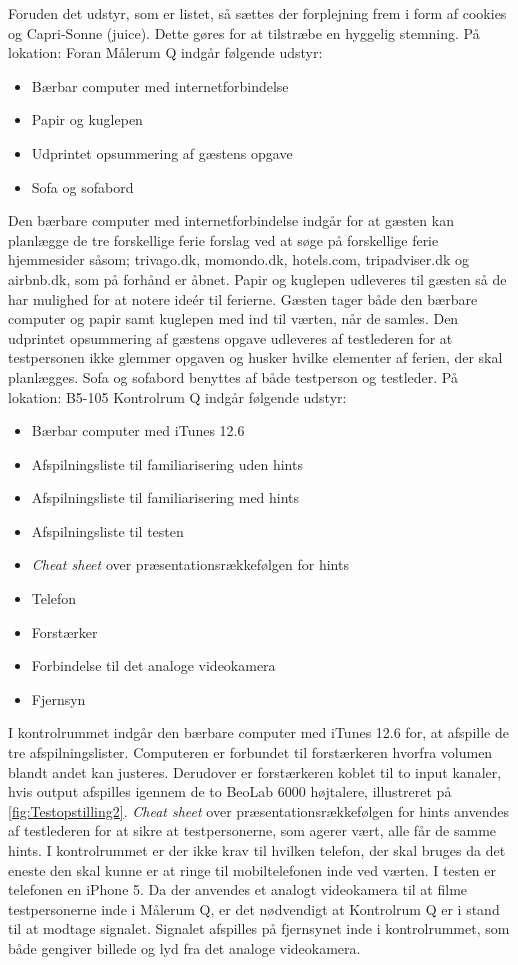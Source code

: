 Foruden det udstyr, som er listet, så sættes der forplejning frem i form af cookies og Capri-Sonne (juice). Dette gøres for at tilstræbe en hyggelig stemning. \blankline  
%
På lokation: Foran Målerum Q indgår følgende udstyr: 
\begin{itemize}
  \item Bærbar computer med internetforbindelse 
  \item Papir og kuglepen 
  \item Udprintet opsummering af gæstens opgave
  \item Sofa og sofabord\blankline
\noindent
\end{itemize}
%
Den bærbare computer med internetforbindelse indgår for at gæsten kan planlægge de tre forskellige ferie forslag ved at søge på forskellige ferie hjemmesider såsom; trivago.dk, momondo.dk, hotels.com, tripadviser.dk og airbnb.dk, som på forhånd er åbnet. Papir og kuglepen udleveres til gæsten så de har mulighed for at notere ideér til ferierne. Gæsten tager både den bærbare computer og papir samt kuglepen med ind til værten, når de samles. Den udprintet opsummering af gæstens opgave udleveres af testlederen for at testpersonen ikke glemmer opgaven og husker hvilke elementer af ferien, der skal planlægges. Sofa og sofabord benyttes af både testperson og testleder. \blankline
% 
På lokation: B5-105 Kontrolrum Q indgår følgende udstyr:
\begin{itemize}
  \item Bærbar computer med iTunes 12.6
  \item Afspilningsliste til familiarisering uden hints 
  \item Afspilningsliste til familiarisering med hints
  \item Afspilningsliste til testen
  \item \textit{Cheat sheet} over præsentationsrækkefølgen for hints 
  \item Telefon
  \item Forstærker 
  \item Forbindelse til det analoge videokamera
  \item Fjernsyn \blankline
\noindent
\end{itemize}
%
I kontrolrummet indgår den bærbare computer med iTunes 12.6 for, at afspille de tre afspilningslister. Computeren er forbundet til forstærkeren hvorfra volumen blandt andet kan justeres. Derudover er forstærkeren koblet til to input kanaler, hvis output afspilles igennem de to BeoLab 6000 højtalere, illustreret på \autoref{fig:Testopstilling2}. \textit{Cheat sheet} over præsentationsrækkefølgen for hints anvendes af testlederen for at sikre at testpersonerne, som agerer vært, alle får de samme hints. I kontrolrummet er der ikke krav til hvilken telefon, der skal bruges da det eneste den skal kunne er at ringe til mobiltelefonen inde ved værten. I testen er telefonen en iPhone 5. Da der anvendes et analogt videokamera til at filme testpersonerne inde i Målerum Q, er det nødvendigt at Kontrolrum Q er i stand til at modtage signalet. Signalet afspilles på fjernsynet inde i kontrolrummet, som både gengiver billede og lyd fra det analoge videokamera.   



